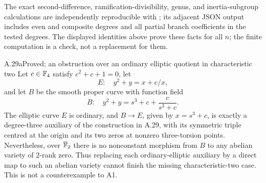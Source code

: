 The exact second-difference, ramification-divisibility, genus,
and inertia-subgroup calculations are independently reproducible
with ; its
adjacent JSON output includes even and composite degrees and
all partial branch coefficients in the tested degrees.
The displayed identities above prove these facts for all $n$;
the finite computation is a check, not a replacement for them.

\begin{claim}{A.29a}{Proved; an obstruction over an ordinary elliptic quotient in characteristic two}
Let $c\in\mathbb F_4$ satisfy $c^2+c+1=0$, let
\[
 E:\quad y^2+y=x+c/x,
\]
and let $B$ be the smooth proper curve with function field
\[
 B:\quad y^2+y=s^3+c+\frac{c}{s^3+c}.                       \tag{A.22}
\]
The elliptic curve $E$ is ordinary, and $B\to E$, given by
$x=s^3+c$, is exactly a degree-three auxiliary of the
construction in A.29, with its symmetric triple centred at
the origin and its two zeros at nonzero three-torsion points.
Nevertheless, over $\overline{\mathbb F}_2$ there is no nonconstant
morphism from $B$ to any abelian variety of $2$-rank zero.
Thus replacing each ordinary-elliptic auxiliary by a direct
map to such an abelian variety cannot finish the missing
characteristic-two case. This is not a counterexample to A1.
\end{claim}
